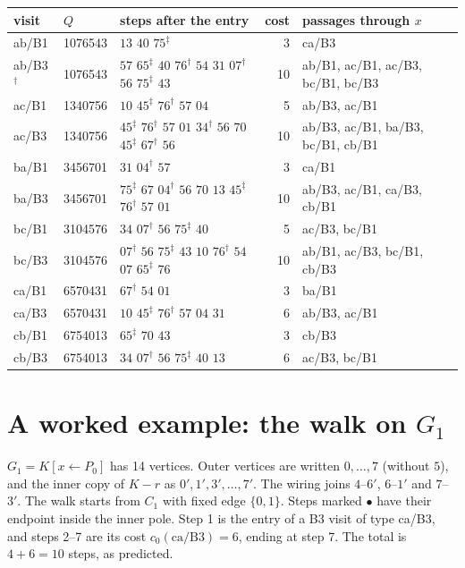\documentclass[11pt]{article}
\theoremstyle{definition}
\begin{document}
{\small
\begin{longtable}{@{}l l >{\raggedright\arraybackslash}p{6.4cm} r >{\raggedright\arraybackslash}p{3.6cm}@{}}
\toprule
visit & $Q$ & steps after the entry & cost & passages through $x$ \\
\midrule
\endhead
ab/B1 & 1076543 & $13$ $40$ $75^{\ddagger}$ & 3 & ca/B3 \\
ab/B3$^{\dagger}$ & 1076543 & $57$ $65^{\ddagger}$ $40$ $76^{\dagger}$ $54$ $31$ $07^{\dagger}$ $56$ $75^{\ddagger}$ $43$ & 10 & ab/B1, ac/B1, ac/B3, bc/B1, bc/B3 \\
ac/B1 & 1340756 & $10$ $45^{\ddagger}$ $76^{\dagger}$ $57$ $04$ & 5 & ab/B3, ac/B1 \\
ac/B3 & 1340756 & $45^{\ddagger}$ $76^{\dagger}$ $57$ $01$ $34^{\dagger}$ $56$ $70$ $45^{\ddagger}$ $67^{\dagger}$ $56$ & 10 & ab/B3, ac/B1, ba/B3, bc/B1, cb/B1 \\
ba/B1 & 3456701 & $31$ $04^{\dagger}$ $57$ & 3 & ca/B1 \\
ba/B3 & 3456701 & $75^{\ddagger}$ $67$ $04^{\dagger}$ $56$ $70$ $13$ $45^{\ddagger}$ $76^{\dagger}$ $57$ $01$ & 10 & ab/B3, ac/B1, ca/B3, cb/B1 \\
bc/B1 & 3104576 & $34$ $07^{\dagger}$ $56$ $75^{\ddagger}$ $40$ & 5 & ac/B3, bc/B1 \\
bc/B3 & 3104576 & $07^{\dagger}$ $56$ $75^{\ddagger}$ $43$ $10$ $76^{\dagger}$ $54$ $07$ $65^{\ddagger}$ $76$ & 10 & ab/B1, ac/B3, bc/B1, cb/B3 \\
ca/B1 & 6570431 & $67^{\dagger}$ $54$ $01$ & 3 & ba/B1 \\
ca/B3 & 6570431 & $10$ $45^{\ddagger}$ $76^{\dagger}$ $57$ $04$ $31$ & 6 & ab/B3, ac/B1 \\
cb/B1 & 6754013 & $65^{\ddagger}$ $70$ $43$ & 3 & cb/B3 \\
cb/B3 & 6754013 & $34$ $07^{\dagger}$ $56$ $75^{\ddagger}$ $40$ $13$ & 6 & ac/B3, bc/B1 \\
\bottomrule
\end{longtable}
}

\section{A worked example: the walk on \texorpdfstring{$G_1$}{G1}}\label{app:example}

$G_1 = K[x \leftarrow P_0]$ has 14 vertices. Outer vertices are written $0, \dots, 7$ (without $5$),
and the inner copy of $K - r$ as $0', 1', 3', \dots, 7'$. The wiring joins $4$--$6'$, $6$--$1'$ and
$7$--$3'$. The walk starts from $C_1$ with fixed edge $\{0,1\}$. Steps marked $\bullet$ have their
endpoint inside the inner pole. Step 1 is the entry of a B3 visit of type ca/B3, and steps 2--7 are
its cost $c_0(\mathrm{ca/B3}) = 6$, ending at step 7. The total is $4 + 6 = 10$ steps, as predicted.
\end{document}
